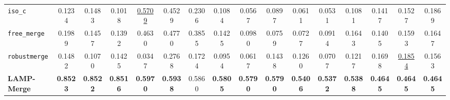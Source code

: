 \begin{table}[t]
\begin{tabular}{lccccccccccccccc}
\texttt{iso\_c} & 0.1234 & 0.1483 & 0.1018 & \underline{0.5709} & 0.4529 & 0.2306 & 0.1084 & 0.0567 & 0.0897 & 0.0611 & 0.0531 & 0.1081 & 0.1417 & 0.1527 & 0.1869 \\
\texttt{free\_merge} & 0.1989 & 0.1457 & 0.1392 & 0.4630 & 0.4770 & 0.3855 & 0.1425 & 0.0980 & 0.0759 & 0.0727 & 0.0914 & 0.1643 & 0.1405 & 0.1593 & 0.1647 \\
\texttt{robustmerge} & 0.1482 & 0.1070 & 0.1425 & 0.0347 & 0.2768 & 0.1724 & 0.0954 & 0.0617 & 0.1438 & 0.1260 & 0.0707 & 0.1217 & 0.1698 & \underline{0.1854} & 0.1563 \\
\textbf{LAMP-Merge} & \textbf{0.8523} & \textbf{0.8522} & \textbf{0.8516} & \textbf{0.5970} & \textbf{0.5938} & 0.5860 & \textbf{0.5805} & \textbf{0.5790} & \textbf{0.5790} & \textbf{0.5406} & \textbf{0.5372} & \textbf{0.5388} & \textbf{0.4645} & \textbf{0.4645} & \textbf{0.4645} \\
\bottomrule
\end{tabular}
\end{table}

